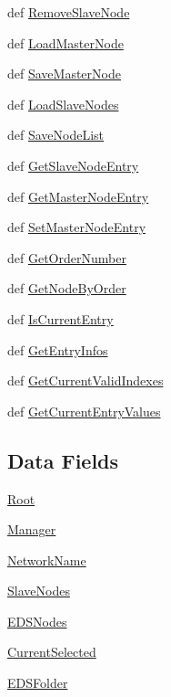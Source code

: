 \begin{CompactItemize}
\item 
def \hyperlink{classnodelist_1_1NodeList_4a54d5c47f48af8060e1b7e0a8a52f6d}{Remove\-Slave\-Node}
\item 
def \hyperlink{classnodelist_1_1NodeList_ff252235b084983f34a6f1455e1ee2a2}{Load\-Master\-Node}
\item 
def \hyperlink{classnodelist_1_1NodeList_d297a4f5ea828c7a56592ffa23ed9913}{Save\-Master\-Node}
\item 
def \hyperlink{classnodelist_1_1NodeList_d0b1264363626cc954199e3fa572620a}{Load\-Slave\-Nodes}
\item 
def \hyperlink{classnodelist_1_1NodeList_b68284c7742c05364af484bbc0b162e6}{Save\-Node\-List}
\item 
def \hyperlink{classnodelist_1_1NodeList_305f512d69651d134aaa585e4aed94b8}{Get\-Slave\-Node\-Entry}
\item 
def \hyperlink{classnodelist_1_1NodeList_d3fd973b32423384bc36ddb0cb54c632}{Get\-Master\-Node\-Entry}
\item 
def \hyperlink{classnodelist_1_1NodeList_cc92822b3c2879ac7df9d0b2f39d4647}{Set\-Master\-Node\-Entry}
\item 
def \hyperlink{classnodelist_1_1NodeList_f8812726aa6302532b6c13a2719b1258}{Get\-Order\-Number}
\item 
def \hyperlink{classnodelist_1_1NodeList_abd3493e147587b88b12e4a6ac7f54e0}{Get\-Node\-By\-Order}
\item 
def \hyperlink{classnodelist_1_1NodeList_c44eb93f2e274ab9e3f47380d71d4aef}{Is\-Current\-Entry}
\item 
def \hyperlink{classnodelist_1_1NodeList_04ede866c9b3431700c7ff4dd87fc67c}{Get\-Entry\-Infos}
\item 
def \hyperlink{classnodelist_1_1NodeList_e98e03e88809cf1dec3c4dc3c8921c99}{Get\-Current\-Valid\-Indexes}
\item 
def \hyperlink{classnodelist_1_1NodeList_005f913bbbfe322fde2aaef4a1521843}{Get\-Current\-Entry\-Values}
\end{CompactItemize}
\subsection*{Data Fields}
\begin{CompactItemize}
\item 
\hyperlink{classnodelist_1_1NodeList_b2f15765f2bd7a7bc5038102e491e87c}{Root}
\item 
\hyperlink{classnodelist_1_1NodeList_629a8a12f02ae1f7d02d0ef7bb0afcbf}{Manager}
\item 
\hyperlink{classnodelist_1_1NodeList_267d8efe86849209ff37f59598efcceb}{Network\-Name}
\item 
\hyperlink{classnodelist_1_1NodeList_88dcdfc5e77e070b9f372591c5b3143a}{Slave\-Nodes}
\item 
\hyperlink{classnodelist_1_1NodeList_eb7afd07a98f688686ccc351404978d3}{EDSNodes}
\item 
\hyperlink{classnodelist_1_1NodeList_c908dab8139683805e6d3816d84a4b9b}{Current\-Selected}
\item 
\hyperlink{classnodelist_1_1NodeList_85d003455c6b3c98bec4e8602acd3fe0}{EDSFolder}
\end{CompactItemize}


